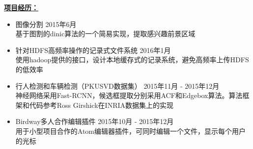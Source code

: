 \documentclass[UTF8]{ctexart}
\begin{document}
\medskip
{\large \textbf{\underline{项目经历：}}}\\
\begin{itemize}
\item 图像分割 \hfill{2015年6月}\\
\smallskip
\small 基于图割的dinic算法的一个简易实现，提取感兴趣前景区域
\normalsize

\item 针对HDFS高频率操作的记录式文件系统 \hfill{2016年1月}\\
\smallskip
\small 使用hadoop提供的接口，设计本地缓存式的记录系统，避免高频率上传HDFS的低效率

\normalsize
\item 行人检测和车辆检测（PKUSVD数据集） \hfill{2015年11月 - 2015年12月}\\
\smallskip
\small 神经网络采用Fast-RCNN，候选框提取分别采用ACF和Edgebox算法。算法框架和代码参考Ross Girshick在INRIA数据集上的实现

\normalsize
\item Birdway多人合作编辑插件 \hfill{2015年10月 - 2015年12月}\\
\smallskip
\small 用于小型项目合作的Atom编辑器插件，可同时编辑一个文件，显示每个用户的光标
\end{itemize}
\end{document}
